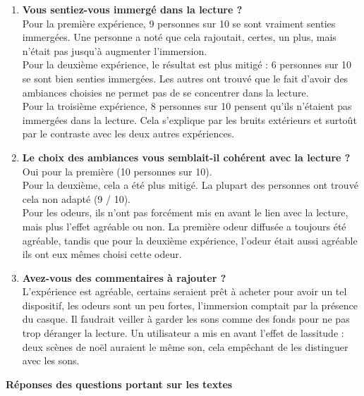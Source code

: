 \documentclass[a4paper,14pt]{report}
\begin{document}
\begin{enumerate}
\item \textbf{Vous sentiez-vous immergé dans la lecture ?} \\
Pour la première expérience, 9 personnes sur 10 se sont vraiment senties immergées. Une personne a noté que cela rajoutait, certes, un plus, mais n'était pas jusqu'à augmenter l'immersion.\\
Pour la deuxième expérience, le résultat est plus mitigé : 6 personnes sur 10 se sont bien senties immergées. Les autres ont trouvé que le fait d'avoir des ambiances choisies ne permet pas de se concentrer dans la lecture. \\
Pour la troisième expérience, 8 personnes sur 10 pensent qu'ils n'étaient pas immergées dans la lecture. Cela s'explique par les bruits extérieurs et surtoût par le contraste avec les deux autres expériences.

\item \textbf{Le choix des ambiances vous semblait-il cohérent avec la lecture ?} \\
Oui pour la première (10 personnes sur 10). \\
Pour la deuxième, cela a été plus mitigé. La plupart des personnes ont trouvé cela non adapté (9 / 10). \\
Pour les odeurs, ils n'ont pas forcément mis en avant le lien avec la lecture, mais plus l'effet agréable ou non. La première odeur diffusée a toujours été agréable, tandis que pour la deuxième expérience, l'odeur était aussi agréable ils ont eux mêmes choisi cette odeur. 

\item \textbf{Avez-vous des commentaires à rajouter ?} \\
L'expérience est agréable, certains seraient prêt à acheter pour avoir un tel dispositif, les odeurs sont un peu fortes, l'immersion comptait par la présence du casque. Il faudrait veiller à garder les sons comme des fonds pour ne pas trop déranger la lecture. Un utilisateur a mis en avant l'effet de lassitude : deux scènes de noël auraient le même son, cela empêchant de les distinguer avec les sons.

\end{enumerate}


\pagebreak

\begin{center}
\textbf{Réponses des questions portant sur les textes}
\end{center}
\end{document}
